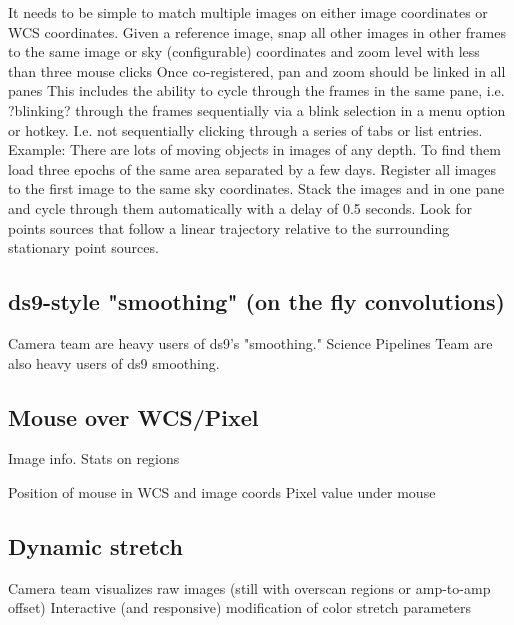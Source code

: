\begin{itemize}
{\item{It needs to be simple to match multiple images on either image coordinates or WCS coordinates.}
Given a reference image, snap all other images in other frames to the same image or sky (configurable) coordinates and zoom level with less than three mouse clicks
Once co-registered, pan and zoom should be linked in all panes
This includes the ability to cycle through the frames in the same pane, i.e. ?blinking? through the frames sequentially via a blink selection in a menu option or hotkey.  I.e. not sequentially clicking through a series of tabs or list entries.
Example: There are lots of moving objects in images of any depth.  To find them load three epochs of the same area separated by a few days.  Register all images to the first image to the same sky coordinates.  Stack the images and in one pane and cycle through them automatically with a delay of 0.5 seconds.  Look for points sources that follow a linear trajectory relative to the surrounding stationary point sources.}
\end{itemize}

\subsection{ds9-style "smoothing" (on the fly convolutions)}
Camera team are heavy users of ds9's  "smoothing."
Science Pipelines Team are also heavy users of ds9 smoothing.

\subsection{Mouse over WCS/Pixel}

Image info. Stats on regions

Position of mouse in WCS and image coords
Pixel value under mouse


\subsection{Dynamic stretch}

Camera team visualizes raw images (still with overscan regions or amp-to-amp offset)
Interactive (and responsive) modification of color stretch parameters

